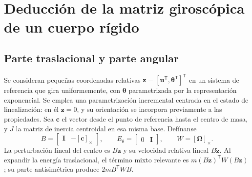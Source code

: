 \documentclass[11pt,a4paper,oneside]{report}
\newcommand{\vct}[1]{\bm{#1}}
\newcommand{\Id}{\mathbf I}
\newcommand{\tr}{\mathsf T}
\begin{document}
\section{Deducción de la matriz giroscópica de un cuerpo rígido}
\subsection{Parte traslacional y parte angular}
Se consideran pequeñas coordenadas relativas $\vct z=[\vct u^{\tr},\vct\theta^{\tr}]^{\tr}$ en un sistema de referencia que gira uniformemente, con $\vct\theta$ parametrizada por la representación exponencial. Se emplea una parametrización incremental centrada en el estado de linealización: en él $\vct z=0$, y su orientación se incorpora previamente a las propiedades. Sea $\vct c$ el vector desde el punto de referencia hasta el centro de masa, y $J$ la matriz de inercia centroidal en esa misma base. Defínanse
\begin{equation}
 B=\begin{bmatrix}\Id&-[\vct c]_\times\end{bmatrix},\qquad
 E_\theta=\begin{bmatrix}0&\Id\end{bmatrix},\qquad W=[\vct\Omega]_\times.
\end{equation}
La perturbación lineal del centro es $B\vct z$ y su velocidad relativa lineal $B\dot{\vct z}$. Al expandir la energía traslacional, el término mixto relevante es $m(B\dot{\vct z})^{\tr}W(B\vct z)$; su parte antisimétrica produce $2mB^{\tr}WB$.
\end{document}
